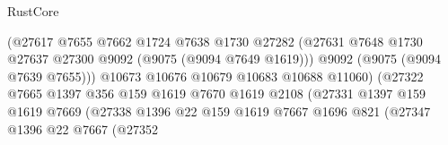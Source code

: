 \begin{lexlean}{RustCore}
\begin{coremodule}
                                            (@27617
                                              @7655
                                              @7662
                                              @1724
                                              @7638
                                              @1730
                                              @27282
                                              (@27631
                                                @7648
                                                @1730
                                                @27637
                                                @27300
                                                @9092
                                                (@9075 (@9094 @7649 @1619)))
                                              @9092
                                              (@9075 (@9094 @7639 @7655)))
                                            @10673
                                            @10676
                                            @10679
                                            @10683
                                            @10688
                                            @11060)
                                          (@27322
                                            @7665
                                            @1397
                                            @356
                                            @159
                                            @1619
                                            @7670
                                            @1619
                                            @2108
                                            (@27331
                                              @1397
                                              @159
                                              @1619
                                              @7669
                                              (@27338
                                                @1396
                                                @22
                                                @159
                                                @1619
                                                @7667
                                                @1696
                                                @821
                                                (@27347
                                                  @1396
                                                  @22
                                                  @7667
                                                  (@27352

\end{coremodule}
\end{lexlean}
